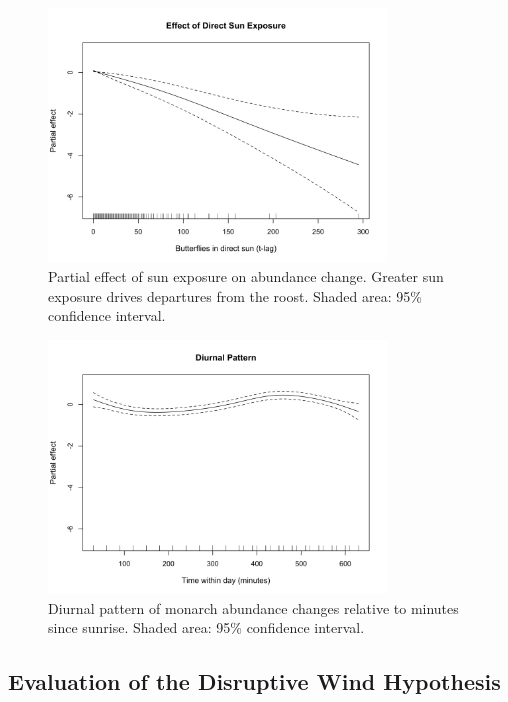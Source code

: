 \begin{figure}[htbp]
\centering
\includegraphics[width=0.8\textwidth]{supplemental/results/thesis_exports/figures/effect_sun_exposure.png}
\caption{Partial effect of sun exposure on abundance change. Greater sun exposure drives departures from the roost. Shaded area: 95\% confidence interval.}
\label{fig:effect_sun}
\end{figure}

\begin{figure}[htbp]
\centering
\includegraphics[width=0.8\textwidth]{supplemental/results/thesis_exports/figures/effect_diurnal_pattern.png}
\caption{Diurnal pattern of monarch abundance changes relative to minutes since sunrise. Shaded area: 95\% confidence interval.}
\label{fig:effect_diurnal}
\end{figure}

\subsection{Evaluation of the Disruptive Wind Hypothesis}


